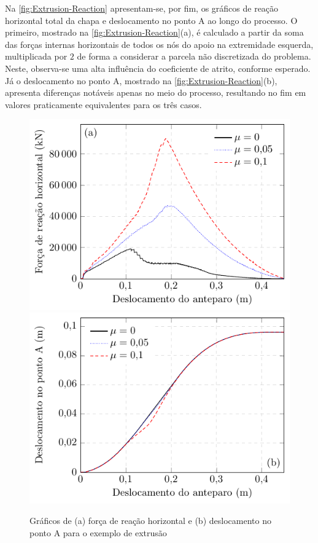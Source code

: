\documentclass[Tese.tex]{subfiles}
\begin{document}
Na \autoref{fig:Extrusion-Reaction} apresentam-se, por fim, os gráficos de reação horizontal total da chapa e deslocamento no ponto A ao longo do processo. O primeiro, mostrado na \autoref{fig:Extrusion-Reaction}(a), é calculado a partir da soma das forças internas horizontais de todos os nós do apoio na extremidade esquerda, multiplicada por $2$ de forma a considerar a parcela não discretizada do problema. Neste, observa-se uma alta influência do coeficiente de atrito, conforme esperado. Já o deslocamento no ponto A, mostrado na \autoref{fig:Extrusion-Reaction}(b), apresenta diferenças notáveis apenas no meio do processo, resultando no fim em valores praticamente equivalentes para os três casos.

\begin{figure}[!htb]
	\centering
	\caption{Gráficos de (a) força de reação horizontal e (b) deslocamento no ponto A para o exemplo de extrusão}
	\label{fig:Extrusion-Reaction}
	\includegraphics[scale=0.9]{Figuras/ExemplosContato/Extrusion-reaction-pt.pdf}\includegraphics[scale=0.9]{Figuras/ExemplosContato/Extrusion-dispA-pt.pdf}
\end{figure}


\newpage
\null
\vfill
\end{document}

